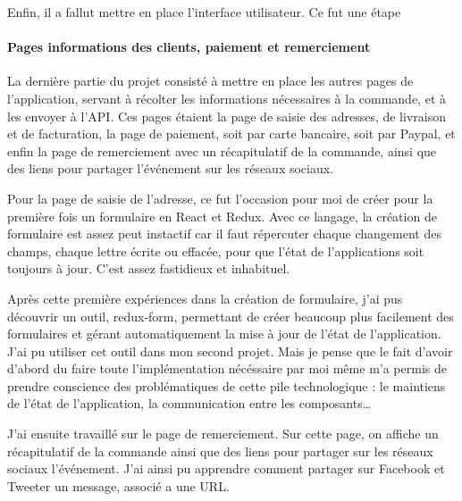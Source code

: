 \bigskip

Enfin, il a fallut mettre en place l'interface utilisateur. Ce fut une
étape

\paragraph{Pages informations des clients, paiement et
remerciement}\label{pages-informations-des-clients-paiement-et-remerciement}

\bigskip

La dernière partie du projet consisté à mettre en place les autres pages
de l'application, servant à récolter les informations nécessaires à la
commande, et à les envoyer à l'API. Ces pages étaient la page de saisie
des adresses, de livraison et de facturation, la page de paiement, soit
par carte bancaire, soit par Paypal, et enfin la page de remerciement
avec un récapitulatif de la commande, ainsi que des liens pour partager
l'événement sur les réseaux sociaux.

\bigskip

Pour la page de saisie de l'adresse, ce fut l'occasion pour moi de créer
pour la première fois un formulaire en React et Redux. Avec ce langage,
la création de formulaire est assez peut instactif car il faut
répercuter chaque changement des champs, chaque lettre écrite ou
effacée, pour que l'état de l'applications soit toujours à jour. C'est
assez fastidieux et inhabituel.

\bigskip

Après cette première expériences dans la création de formulaire, j'ai
pus découvrir un outil, redux-form, permettant de créer beaucoup plus
facilement des formulaires et gérant automatiquement la mise à jour de
l'état de l'application. J'ai pu utiliser cet outil dans mon second
projet. Mais je pense que le fait d'avoir d'abord du faire toute
l'implémentation nécéssaire par moi même m'a permis de prendre
conscience des problématiques de cette pile technologique : le maintiens
de l'état de l'application, la communication entre les
composants\ldots{}

\bigskip

J'ai ensuite travaillé sur le page de remerciement. Sur cette page, on
affiche un récapitulatif de la commande ainsi que des liens pour
partager sur les réseaux sociaux l'événement. J'ai ainsi pu apprendre
comment partager sur Facebook et Tweeter un message, associé a une URL.

\bigskip


